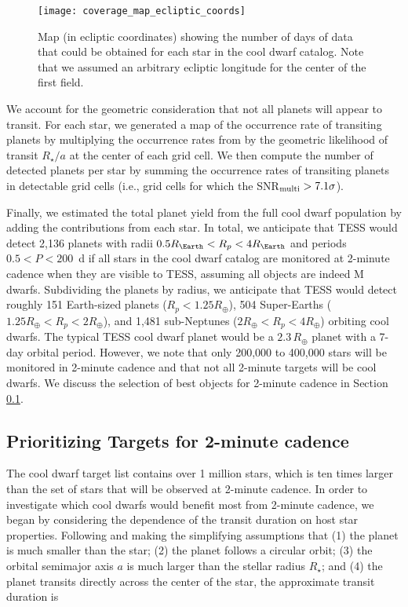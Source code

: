 \documentclass[twocolumn]{aastex62}
\begin{document}
\begin{figure}[tbp]
    \centering
    \texttt{[image: coverage\_map\_ecliptic\_coords]}
    \caption{Map (in ecliptic coordinates) showing the number of days of data that could be obtained for each star in the cool dwarf catalog. Note that we assumed an arbitrary ecliptic longitude for the center of the first field.}
    \label{fig:survey_geometry}
\end{figure}

We account for the geometric consideration that not all planets will appear to transit. For each star, we generated a map of the occurrence rate of transiting planets by multiplying the occurrence rates from \citet{Dressing2015} by the geometric likelihood of transit $R_\star/a$ at the center of each grid cell. We then compute the number of detected planets per star by summing the occurrence rates of transiting planets in detectable grid cells (i.e., grid cells for which the SNR$_{\rm multi} > 7.1\sigma$). 


Finally, we estimated the total planet yield from the full cool dwarf population by adding the contributions from each star. In total, we anticipate that TESS would detect 2,136 planets with radii $0.5 R_\Earth< R_p <4R_\Earth$ and periods $0.5 < P < 200$~d if all stars in the cool dwarf catalog are monitored at 2-minute cadence when they are visible to TESS, assuming all objects are indeed M dwarfs. Subdividing the planets by radius, we anticipate that TESS would detect roughly  151 Earth-sized planets ($R_p <1.25R_\oplus$), 504 Super-Earths ($1.25R_\oplus < R_p <2R_\oplus$), and 1,481 sub-Neptunes ($2R_\oplus < R_p <4R_\oplus$) orbiting cool dwarfs. The typical TESS cool dwarf planet would be a $2.3 \, R_\oplus$ planet with a 7-day orbital period. However, we note that only 200,000 to 400,000 stars will be monitored in 2-minute cadence and that not all 2-minute targets will be cool dwarfs.  We discuss the selection of best objects for 2-minute cadence in Section \ref{twomin}.


\subsection{Prioritizing Targets for 2-minute cadence}\label{twomin}
The cool dwarf target list contains over 1 million stars, which is ten times larger than the set of stars that will be observed at 2-minute cadence. In order to investigate which cool dwarfs would benefit most from 2-minute cadence, we began by considering the dependence of the transit duration on host star properties. Following \citet{winn2010} and making the simplifying assumptions that (1) the planet is much smaller than the star; (2) the planet follows a circular orbit; (3) the orbital semimajor axis $a$ is much larger than the stellar radius $R_\star$; and (4) the planet transits directly across the center of the star, the approximate transit duration is
\end{document}
